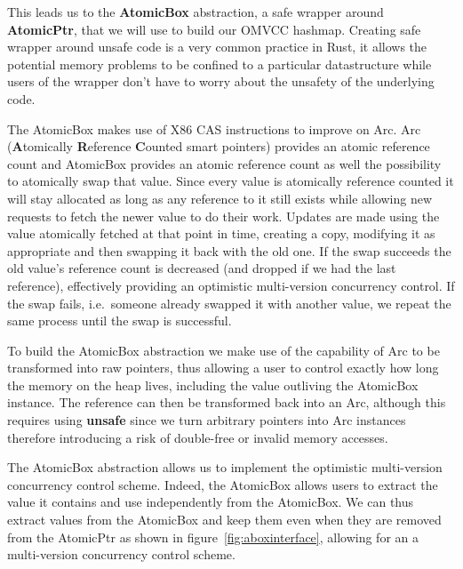 

This leads us to the \textbf{AtomicBox} abstraction, a safe wrapper
around \textbf{AtomicPtr}, that we will use to build our OMVCC
hashmap. Creating safe wrapper around unsafe code is a very common
practice in Rust, it allows the potential memory problems to be
confined to a particular datastructure while users of the wrapper
don't have to worry about the unsafety of the underlying code.

The AtomicBox makes use of X86 CAS instructions to improve on
Arc. Arc (\textbf{A}tomically \textbf{R}eference \textbf{C}ounted
smart pointers) provides an atomic reference count and AtomicBox
provides an atomic reference count as well the possibility to
atomically swap that value. Since every value is atomically reference
counted it will stay allocated as long as any reference to it still
exists while allowing new requests to fetch the newer value to do
their work. Updates are made using the value atomically fetched at
that point in time, creating a copy, modifying it as appropriate and
then swapping it back with the old one. If the swap succeeds the old
value's reference count is decreased (and dropped if we had the last
reference), effectively providing an optimistic multi-version
concurrency control. If the swap fails, i.e.\ someone already swapped
it with another value, we repeat the same process until the swap is
successful.

To build the AtomicBox abstraction we make use of the capability of
Arc to be transformed into raw pointers, thus allowing a user to
control exactly how long the memory on the heap lives, including the
value outliving the AtomicBox instance. The reference can then be
transformed back into an Arc, although this requires using
\textbf{unsafe} since we turn arbitrary pointers into Arc instances
therefore introducing a risk of double-free or invalid memory
accesses.



The AtomicBox abstraction allows us to implement the optimistic
multi-version concurrency control scheme. Indeed, the AtomicBox allows
users to extract the value it contains and use independently from the
AtomicBox. We can thus extract values from the AtomicBox and keep them
even when they are removed from the AtomicPtr as shown in
figure~\ref{fig:aboxinterface}, allowing for an a multi-version
concurrency control scheme.

